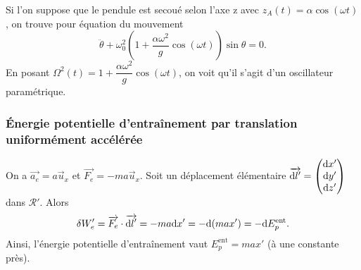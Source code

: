             Si l'on suppose que le pendule est secoué selon l'axe z avec $z_{A}(t)=\alpha\cos(\omega t)$, on trouve pour équation du mouvement
            \begin{equation}
                \ddot{\theta}+\omega_{0}^{2}\left(1+\frac{\alpha\omega^{2}}{g}\cos(\omega t)\right)\sin\theta = 0.
            \end{equation}
            En posant $\Omega^{2}(t)=1+\dfrac{\alpha\omega^{2}}{g}\cos(\omega t)$, on voit qu'il s'agit d'un oscillateur paramétrique.

        \subsubsection{Énergie potentielle d'entraînement par translation uniformément accélérée}
            
            On a $\vec{a_e}=a\vec{u}_x$ et $\vec{F_e}=-ma\vec{u}_x$. Soit un déplacement élémentaire $\protect\overrightarrow{{\mathrm{d} l'}}=\begin{pmatrix}\mathrm{d} x'\\\mathrm{d} y'\\\mathrm{d} z'\end{pmatrix} $ dans $\mathcal{R}'$. Alors 
            \begin{equation}
                \delta W_e'=\protect\overrightarrow{{F_e}}\cdot\protect\overrightarrow{{\mathrm{d} l'}}=-ma\mathrm{d} x'=-\mathrm{d}(max')=-\mathrm{d} E_p^{\text{ent}}.
            \end{equation}
            Ainsi, l'énergie potentielle d'entraînement vaut $E_{p}^{\text{ent}}=max'$ (à une constante près).

